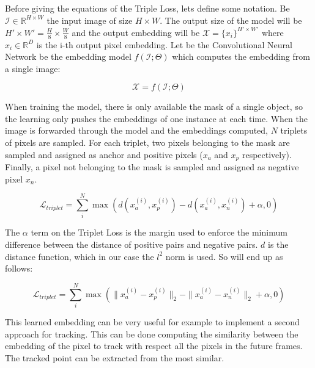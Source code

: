 Before giving the equations of the Triple Loss, lets define some notation.
Be $\mathcal{I} \in \mathbb{R}^{H \times W}$ the input image of size $H \times W$.
The output size of the model will be $H' \times W' = \frac{H}{8} \times \frac{W}{8}$ and the output embedding will be $\mathcal{X} = \{x_i\}^{H' \times W'}$ where $x_i \in \mathbb{R}^D$ is the i-th output pixel embedding.
Let be the Convolutional Neural Network be the embedding model $f(\mathcal{I}; \Theta)$ which computes the embedding from a single image:

\begin{equation}
  \mathcal{X} = f(\mathcal{I}; \Theta)
\end{equation}

When training the model,
there is only available the mask of a single object, so the learning only pushes the embeddings of one instance at each time.
When the image is forwarded through the model and the embeddings computed, $N$ triplets of pixels are sampled.
For each triplet, two pixels belonging to the mask are sampled and assigned as anchor and positive pixels ($x_a$ and $x_p$ respectively).
Finally, a pixel not belonging to the mask is sampled and assigned as negative pixel $x_n$.

\begin{equation}
  \label{eq:triplet_loss_1}
  \mathcal{L}_{triplet} = \sum_i^N \max \left( d(x_a^{(i)}, x_p^{(i)}) - d(x_a^{(i)}, x_n^{(i)})  + \alpha, 0 \right)
\end{equation}

The $\alpha$ term on the Triplet Loss is the margin used to enforce the minimum difference between the distance of positive pairs and negative pairs.
$d$ is the distance function, which in our case the $l^2$ norm is used.
So  will end up as follows:

\begin{equation}
  \label{eq:triplet_loss_2}
  \mathcal{L}_{triplet} =
	\sum_i^N \max \left(
		\|x_a^{(i)} - x_p^{(i)}\|_2 - \|x_a^{(i)} - x_n^{(i)}\|_2  + \alpha,
		0 \right)
\end{equation}

This learned embedding can be very useful for example to implement a second approach for tracking.
This can be done computing the similarity between the embedding of the pixel to track with respect all the pixels in the future frames.
The tracked point can be extracted from the most similar.


